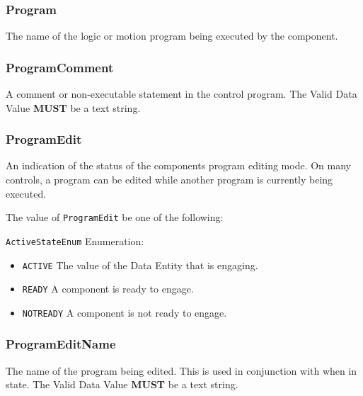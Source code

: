 \subsubsection{Program}
\label{sec:Program}



The name of the logic or motion program being executed by the  component.


\subsubsection{ProgramComment}
\label{sec:ProgramComment}



A comment or non-executable statement in the control program.
 The \gls{Valid Data Value} \textbf{MUST} be a text string.


\subsubsection{ProgramEdit}
\label{sec:ProgramEdit}



An indication of the status of the  components program editing mode. 
 On many controls, a program can be edited while another program is currently being executed.


The value of \texttt{ProgramEdit} \MUST be one of the following: 


\texttt{ActiveStateEnum} Enumeration:

\begin{itemize}
\item \texttt{ACTIVE} \newline The value of the \gls{Data Entity} that is engaging. 
\item \texttt{READY} \newline A component is ready to engage. 
\item \texttt{NOT\textunderscore READY} \newline A component is not ready to engage. 
\end{itemize}

\FloatBarrier

\subsubsection{ProgramEditName}
\label{sec:ProgramEditName}



The name of the program being edited. 
 This is used in conjunction with  when in  state. 
 The \gls{Valid Data Value} \textbf{MUST} be a text string.


